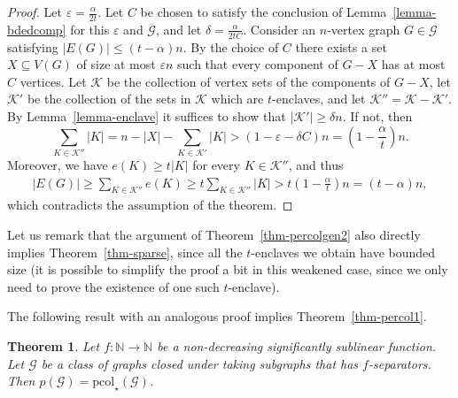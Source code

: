 \documentclass[12pt]{article}
\newtheorem{theorem}{Theorem}
\newcommand{\eps}{\varepsilon}
\newcommand{\mc}[1]{\mathcal{#1}}
\begin{document}
\begin{proof}
	Let $\eps = \frac{\alpha}{2t}$.   Let $C$ be chosen to satisfy the conclusion of Lemma~\ref{lemma-bdedcomp} for this $\varepsilon$ and $\mc{G}$, and let $\delta=\frac{\alpha}{2tC}$.
	Consider an $n$-vertex graph $G \in \mc{G}$ satisfying $|E(G)| \leq (t-\alpha)n$. By the choice of $C$ there exists a set $X \subseteq V(G)$ of size
	at most $\varepsilon n$ such that every component of $G - X$ has at most $C$ vertices. Let $\mc{K}$ be the collection of vertex sets
	of the components of $G - X$, let $\mc{K}'$ be the collection of the sets in $\mc{K}$ which are $t$-enclaves,
	and let $\mc{K}'' = \mc{K} - \mc{K}'$.  By Lemma~\ref{lemma-enclave} it suffices to show that $|\mc{K}'| \geq \delta n$.
	If not, then $$\sum_{K \in \mc{K}''}|K| = n - |X| - \sum_{K \in \mc{K}'}|K| > (1 - \eps - \delta C)n = \left(1 - \frac{\alpha}{t}\right)n.$$
	Moreover, we have $e(K) \geq t |K|$ for every $K \in \mc{K}''$, and thus
	\begin{align*}
	|E(G)| \geq \sum_{K \in \mc{K''}}e(K) \geq t\sum_{K \in \mc{K''}}|K| >  t\left(1 - \frac{\alpha}{t}\right)n = (t -\alpha)n,
	\end{align*}
	which contradicts the assumption of the theorem.
\end{proof}

Let us remark that the argument of Theorem~\ref{thm-percolgen2} also directly implies Theorem~\ref{thm-sparse},
since all the $t$-enclaves we obtain have bounded size (it is possible to simplify the proof a bit in this weakened case,
since we only need to prove the existence of one such $t$-enclave).

The following result with an analogous proof implies Theorem~\ref{thm-percol1}.

\begin{theorem}\label{thm-percolgen}
	Let $f:\mathbb{N}\to\mathbb{N}$ be a non-decreasing significantly sublinear function.
	Let $\mc{G}$ be a class of graphs closed under taking subgraphs that has $f$-separators.
	Then $p(\mc{G}) = \text{pcol}_\star(\mc{G})$.
\end{theorem}
\end{document}
